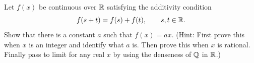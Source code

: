 \begin{exercise}
  \label{ex:hw05:continuous-additive-function}
  Let $f(x)$ be continuous over $\mathbb{R}$ satisfying the additivity condition
  \[
    f(s+t)=f(s)+f(t),\qquad s,t\in\mathbb{R}.
  \]
  Show that there is a constant $a$ such that $f(x)=ax$.
  (Hint: First prove this when $x$ is an integer and identify what $a$
  is. Then prove this when $x$ is rational. Finally pass to limit for
  any real $x$ by using the denseness of $\mathbb{Q}$ in $\mathbb{R}$.)
\end{exercise}
